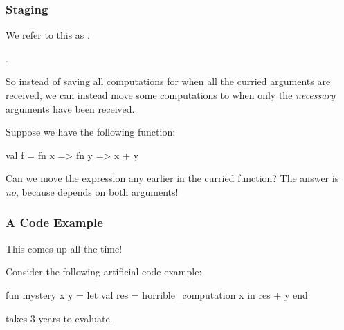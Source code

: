 \documentclass[aspectratio=169]{beamer}
\begin{document}
\begin{frame}[fragile]
  \frametitle{Staging}

  We refer to this as .

  \pause
  \vspace{\fill}
  
  .

  \pause
  \vspace{\fill}

  So instead of saving all computations for when all the curried arguments are received,
  we can instead move some computations to when only the \textit{necessary} arguments
  have been received.

  \pause
  \vspace{\fill}

  Suppose we have the following function:
  \begin{codeblock}
    val f = fn x => fn y => x + y
  \end{codeblock}

  \pause
  \vspace{\fill}

  Can we move the expression  any earlier in the curried function? The 
  answer is \textit{no}, because  depends on both arguments!
\end{frame}

\begin{frame}[fragile]
  \frametitle{A Code Example}

  This comes up all the time!

  \pause
  \vspace{\fill}

  Consider the following artificial code example:

  \begin{codeblock}
    fun mystery x y =
      let
        val res = horrible_computation x
      in
        res + y
      end 
  \end{codeblock}

  \pause
  \vspace{\fill}

   takes 3 years to evaluate.
\end{frame}
\end{document}

